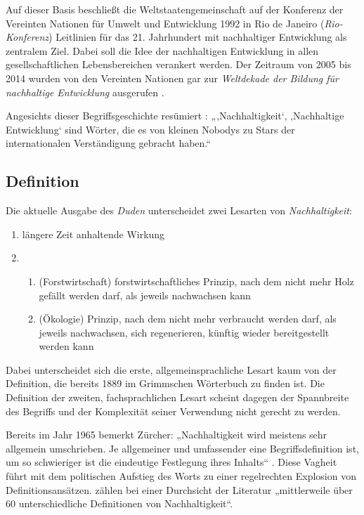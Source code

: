 \documentclass[
    german,
    a4paper,%
    12pt,%
    oneside,%
    toc=bibliography,
    final,
]{scrartcl}
\begin{document}
Auf dieser Basis beschließt die Weltstaatengemeinschaft auf der Konferenz der Vereinten Nationen für Umwelt und Entwicklung 1992 in Rio de Janeiro (\textit{Rio-Konferenz}) Leitlinien für das 21. Jahrhundert mit nachhaltiger Entwicklung als zentralem Ziel. Dabei soll die Idee der nachhaltigen Entwicklung in allen gesellschaftlichen Lebensbereichen verankert werden. Der Zeitraum von 2005 bis 2014 wurden von den Vereinten Nationen gar zur \textit{Weltdekade der Bildung für nachhaltige Entwicklung} ausgerufen \citep[vgl.][12]{OhlmeierBrunold2015}.

Angesichts dieser Begriffsgeschichte resümiert \citet[10]{Ninck1997}: „‚Nachhaltigkeit‘, ‚Nachhaltige Entwicklung‘ sind Wörter, die es von kleinen Nobodys zu Stars der internationalen Verständigung gebracht haben.“

\subsection{Definition}
\label{subsec:definition}

Die aktuelle Ausgabe des \textit{Duden} unterscheidet zwei Lesarten von \textit{Nachhaltigkeit}:

\begin{enumerate}[rightmargin=1cm]
\item längere Zeit anhaltende Wirkung
\item 
	\begin{enumerate}
	\item (Forstwirtschaft) forstwirtschaftliches Prinzip, nach dem nicht mehr Holz gefällt werden darf, als jeweils nachwachsen kann
	\item (Ökologie) Prinzip, nach dem nicht mehr verbraucht werden darf, als jeweils nachwachsen, sich regenerieren, künftig wieder bereitgestellt werden kann
	\end{enumerate}
	\hfill\citep{Duden2017}
\end{enumerate}

Dabei unterscheidet sich die erste, allgemeinsprachliche Lesart kaum von der Definition, die bereits 1889 im Grimmschen Wörterbuch zu finden ist. Die Definition der zweiten, fachsprachlichen Lesart scheint dagegen der Spannbreite des Begriffs und der Komplexität seiner Verwendung nicht gerecht zu werden.

Bereits im Jahr 1965 bemerkt Zürcher: „Nachhaltigkeit wird meistens sehr allgemein umschrieben. Je allgemeiner und umfassender eine Begriffsdefinition ist, um so schwieriger ist die eindeutige Festlegung ihres Inhalts“ \citep[94]{Zürcher1965}. Diese Vagheit führt mit dem politischen Aufstieg des Worts zu einer regelrechten Explosion von Definitionsansätzen. \citet[1]{Kastenholz-et-al1996} zählen bei einer Durchsicht der Literatur „mittlerweile über 60 unterschiedliche Definitionen von Nachhaltigkeit“.
\end{document}
